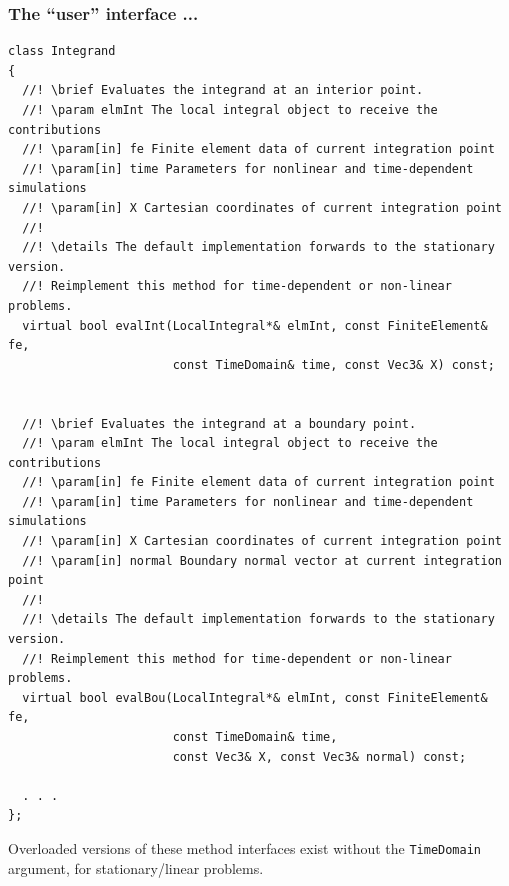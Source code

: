 \documentclass{beamer}
\begin{document}
\begin{frame}[fragile] %

 \frametitle{The ``user'' interface ...}

 \tiny
 \begin{verbatim}
class Integrand
{
  //! \brief Evaluates the integrand at an interior point.
  //! \param elmInt The local integral object to receive the contributions
  //! \param[in] fe Finite element data of current integration point
  //! \param[in] time Parameters for nonlinear and time-dependent simulations
  //! \param[in] X Cartesian coordinates of current integration point
  //!
  //! \details The default implementation forwards to the stationary version.
  //! Reimplement this method for time-dependent or non-linear problems.
  virtual bool evalInt(LocalIntegral*& elmInt, const FiniteElement& fe,
                       const TimeDomain& time, const Vec3& X) const;


  //! \brief Evaluates the integrand at a boundary point.
  //! \param elmInt The local integral object to receive the contributions
  //! \param[in] fe Finite element data of current integration point
  //! \param[in] time Parameters for nonlinear and time-dependent simulations
  //! \param[in] X Cartesian coordinates of current integration point
  //! \param[in] normal Boundary normal vector at current integration point
  //!
  //! \details The default implementation forwards to the stationary version.
  //! Reimplement this method for time-dependent or non-linear problems.
  virtual bool evalBou(LocalIntegral*& elmInt, const FiniteElement& fe,
                       const TimeDomain& time,
                       const Vec3& X, const Vec3& normal) const;

  . . .
};
 \end{verbatim}
 \vskip-5mm\footnotesize
 Overloaded versions of these method interfaces exist without the
 {\tt TimeDomain} argument, for stationary/linear problems.
\end{frame}
\end{document}
